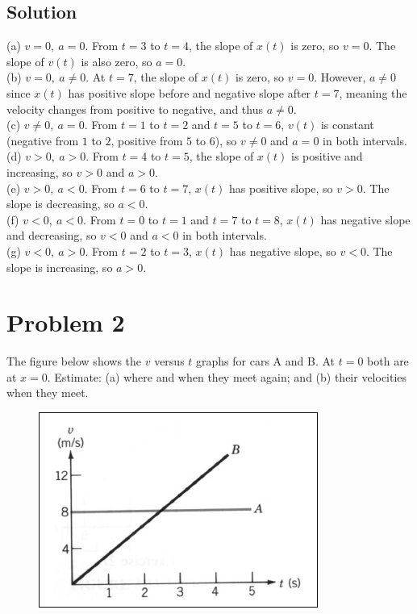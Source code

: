 \documentclass{article}
\begin{document}
\subsection*{Solution}
(a) $v = 0,\ a = 0$. From $t = 3$ to $t = 4$, the slope of $x(t)$ is zero, so $v = 0$. The slope of $v(t)$ is also zero, so $a = 0$.\\
(b) $v = 0,\ a \ne 0$. At $t = 7$, the slope of $x(t)$ is zero, so $v = 0$. However, $a \ne 0$ since $x(t)$ has positive slope before and negative slope after $t = 7$, meaning the velocity changes from positive to negative, and thus $a \ne 0$.\\
(c) $v \ne 0,\ a = 0$. From $t = 1$ to $t = 2$ and $t = 5$ to $t = 6$, $v(t)$ is constant (negative from $1$ to $2$, positive from $5$ to $6$), so $v \ne 0$ and $a = 0$ in both intervals.\\
(d) $v > 0,\ a > 0$. From $t = 4$ to $t = 5$, the slope of $x(t)$ is positive and increasing, so $v > 0$ and $a > 0$.\\
(e) $v > 0,\ a < 0$. From $t = 6$ to $t = 7$, $x(t)$ has positive slope, so $v > 0$. The slope is decreasing, so $a < 0$.\\
(f) $v < 0,\ a < 0$. From $t = 0$ to $t = 1$ and $t = 7$ to $t = 8$, $x(t)$ has negative slope and decreasing, so $v < 0$ and $a < 0$ in both intervals.\\
(g) $v < 0,\ a > 0$. From $t = 2$ to $t = 3$, $x(t)$ has negative slope, so $v < 0$. The slope is increasing, so $a > 0$.\\

\section*{Problem 2}
The figure below shows the $v$ versus $t$ graphs for cars A and B. At $t = 0$ both are at $x = 0$.
Estimate: (a) where and when they meet again; and (b) their velocities when they meet.

\begin{figure}[ht]
    \centering
    \includegraphics[scale=0.5]{graph-2.png}
\end{figure}
\end{document}
